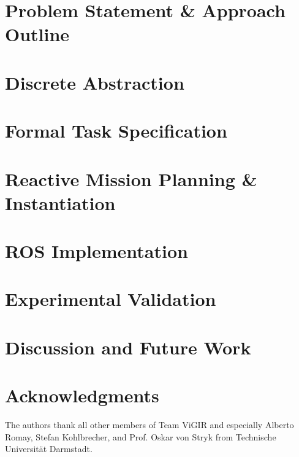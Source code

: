 \documentclass[letterpaper, 10 pt, conference]{ieeeconf}	%
\begin{document}
\section{Problem Statement \& Approach Outline}\label{S:problem}

%
\section{Discrete Abstraction}\label{S:abstraction}

%
\section{Formal Task Specification}\label{S:ltl}

%
\section{Reactive Mission Planning \& Instantiation}\label{S:synthesis}

%
\section{ROS Implementation}\label{S:implementation}

%
\section{Experimental Validation}\label{S:experiments}

%
\section{Discussion and Future Work}\label{S:conclusion}

%
\section*{Acknowledgments}
The authors thank all other members of Team ViGIR and especially Alberto Romay, Stefan Kohlbrecher, and Prof. Oskar von Stryk from Technische Universit\"{a}t Darmstadt.
%
%


%
\end{document}

